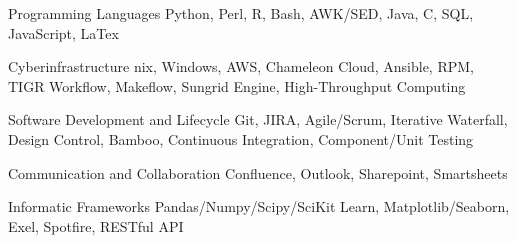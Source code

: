 

\begin{cvskills}

  \cvskill
    {Programming Languages} %
    {Python, Perl, R, Bash, AWK/SED, Java, C, SQL, JavaScript, LaTex} %

  \cvskill
    {Cyberinfrastructure} %
    {nix, Windows, AWS, Chameleon Cloud, Ansible, RPM, TIGR Workflow, Makeflow, Sungrid Engine, High-Throughput Computing} %

  \cvskill
    {Software Development and Lifecycle} %
    {Git, JIRA, Agile/Scrum, Iterative Waterfall, Design Control, Bamboo, Continuous Integration, Component/Unit Testing} %

    \cvskill
    {Communication and Collaboration}
    {Confluence, Outlook, Sharepoint, Smartsheets}

  \cvskill
    {Informatic Frameworks} %
    {Pandas/Numpy/Scipy/SciKit Learn, Matplotlib/Seaborn, Exel, Spotfire, RESTful API} %

\end{cvskills}
